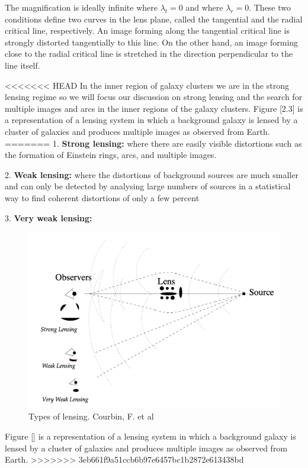 The magnification is ideally infinite where $\lambda_t=0$ and where $\lambda_r=0$. These two conditions define two curves in the lens plane, called the tangential and the radial critical line, respectively. An image forming along the tangential critical line is strongly distorted tangentially to this line. On the other hand, an image forming close to the radial critical line is stretched in the direction perpendicular to the line itself. 

<<<<<<< HEAD
In the inner region of galaxy clusters we are in the strong lensing regime so we will focus our discussion on strong lensing and the search for multiple images and arcs in the inner regions of the galaxy clusters. Figure [2.3] is a representation of a lensing system in which a background galaxy is lensed by a cluster of galaxies and produces multiple images as observed from Earth. 
=======
1. \textbf{Strong lensing:} where there are easily visible distortions such as the formation of Einstein rings, arcs, and multiple images.

2.\textbf{ Weak lensing:} where the distortions of background sources are much smaller and can only be detected by analysing large numbers of sources in a statistical way to find coherent distortions of only a few percent

3. \textbf{Very weak lensing:} 

\begin{figure}[H]
\centering
\includegraphics[width=12cm]{images/types_of_lensing.png}
\caption[Types of lensing]{Types of lensing. Courbin, F. et al \citeyear{Reference24}}
\end{figure}

Figure [] is a representation of a lensing system in which a background galaxy is lensed by a cluster of galaxies and produces multiple images as observed from Earth. 
>>>>>>> 3eb661f9a51ccb6b97e6457bc1b2872e613438bd

